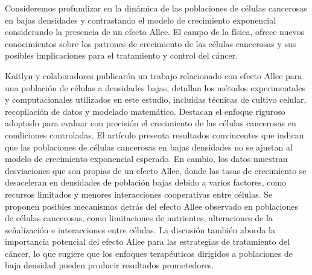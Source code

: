 \documentclass{article}
\begin{document}
Consideremos profundizar en la dinámica de las poblaciones de células cancerosas en bajas densidades y contrastando el modelo de crecimiento exponencial considerando la presencia de un efecto Allee. El campo de la física, ofrece nuevos conocimientos sobre los patrones de crecimiento de las células cancerosas y sus posibles implicaciones para el tratamiento y control del cáncer.

Kaitlyn y colaboradores\cite{Kaitlyn1782019} publicarón un trabajo relacionado con efecto Allee para una población de células a densidades bajas, detallan los métodos experimentales y computacionales utilizados en este estudio, incluidas técnicas de cultivo celular, recopilación de datos y modelado matemático. Destacan el enfoque riguroso adoptado para evaluar con precisión el crecimiento de las células cancerosas en condiciones controladas. El artículo presenta resultados convincentes que indican que las poblaciones de células cancerosas en bajas densidades no se ajustan al modelo de crecimiento exponencial esperado. En cambio, los datos muestran desviaciones que son propias de un efecto Allee, donde las tasas de crecimiento se desaceleran en densidades de población bajas debido a varios factores, como recursos limitados y menores interacciones cooperativas entre células. Se proponen posibles mecanismos detrás del efecto Allee observado en poblaciones de células cancerosas, como limitaciones de nutrientes, alteraciones de la señalización e interacciones entre células. La discusión también aborda la importancia potencial del efecto Allee para las estrategias de tratamiento del cáncer, lo que sugiere que los enfoques terapéuticos dirigidos a poblaciones de baja densidad pueden producir resultados prometedores.
\end{document}

